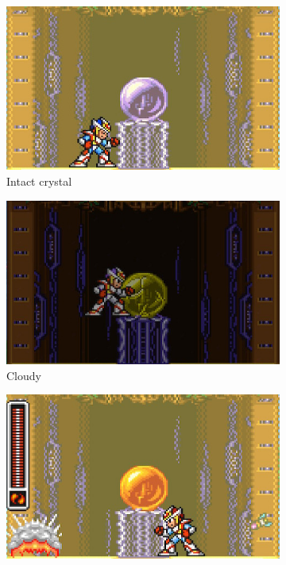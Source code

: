 \begin{figure}[htp]
	\centering
	\begin{subfigure}{0.3\linewidth}
		\centering
		\includegraphics[width=\linewidth]{figures/X2/Wire_sponge/sponge_crystal_default.jpg}
		\caption{Intact crystal}
	\end{subfigure}
	\begin{subfigure}{0.3\linewidth}
		\centering
		\includegraphics[width=\linewidth]{figures/X2/Wire_sponge/sponge_crystal_cloud.jpg}		
		\caption{Cloudy}
	\end{subfigure}
	\begin{subfigure}{0.3\linewidth}
		\centering
		\includegraphics[width=\linewidth]{figures/X2/Wire_sponge/sponge_crystal_sun.jpg}

\end{subfigure}
\end{figure}
